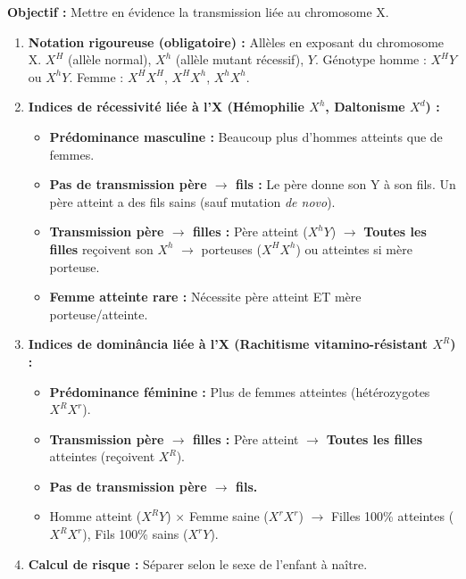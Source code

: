 \documentclass[11pt]{article}
\begin{document}
\begin{methode}
    \textbf{Objectif :} Mettre en évidence la transmission liée au chromosome X.
    \begin{enumerate}
        \item \textbf{Notation rigoureuse (obligatoire) :} Allèles en exposant du chromosome X. $X^H$ (allèle normal), $X^h$ (allèle mutant récessif), $Y$. Génotype homme : $X^H Y$ ou $X^h Y$. Femme : $X^H X^H$, $X^H X^h$, $X^h X^h$.
        \item \textbf{Indices de récessivité liée à l'X (Hémophilie $X^h$, Daltonisme $X^d$) :}
              \begin{itemize}
                  \item \textbf{Prédominance masculine :} Beaucoup plus d'hommes atteints que de femmes.
                  \item \textbf{Pas de transmission père $\rightarrow$ fils :} Le père donne son Y à son fils. Un père atteint a des fils sains (sauf mutation \emph{de novo}).
                  \item \textbf{Transmission père $\rightarrow$ filles :} Père atteint ($X^h Y$) $\rightarrow$ \textbf{Toutes les filles} reçoivent son $X^h$ $\rightarrow$ porteuses ($X^H X^h$) ou atteintes si mère porteuse.
                  \item \textbf{Femme atteinte rare :} Nécessite père atteint ET mère porteuse/atteinte.
              \end{itemize}
        \item \textbf{Indices de dominância liée à l'X (Rachitisme vitamino-résistant $X^R$) :}
              \begin{itemize}
                  \item \textbf{Prédominance féminine :} Plus de femmes atteintes (hétérozygotes $X^R X^r$).
                  \item \textbf{Transmission père $\rightarrow$ filles :} Père atteint $\rightarrow$ \textbf{Toutes les filles} atteintes (reçoivent $X^R$).
                  \item \textbf{Pas de transmission père $\rightarrow$ fils.}
                  \item Homme atteint ($X^R Y$) $\times$ Femme saine ($X^r X^r$) $\rightarrow$ Filles 100\% atteintes ($X^R X^r$), Fils 100\% sains ($X^r Y$).
              \end{itemize}
        \item \textbf{Calcul de risque :} Séparer selon le sexe de l'enfant à naître.

\end{enumerate}
\end{methode}
\end{document}
